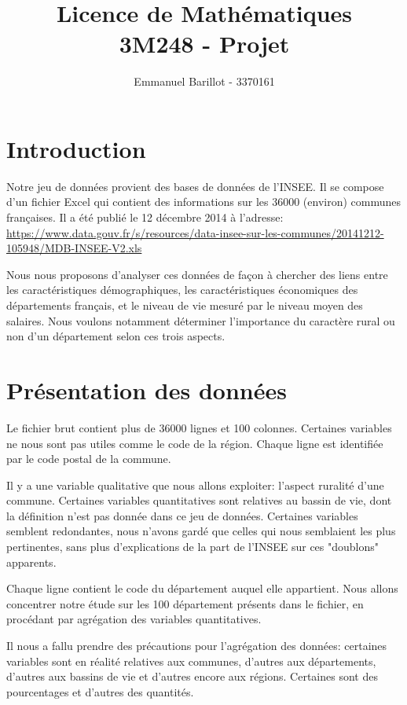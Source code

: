 \documentclass[a4paper,11pt]{article}
\title{Licence de Mathématiques \\3M248 - Projet}
\author{Emmanuel Barillot - 3370161}
\begin{document}
\maketitle



\section{Introduction}
Notre jeu de données provient des bases de données de l'INSEE. Il se compose d'un fichier Excel qui contient des informations sur les 36000 (environ) communes françaises.
Il a été publié le 12 décembre 2014 à l'adresse: 
\href{https://www.data.gouv.fr/s/resources/data-insee-sur-les-communes/20141212-105948/MDB-INSEE-V2.xls}{https://www.data.gouv.fr/s/resources/data-insee-sur-les-communes/20141212-105948/MDB-INSEE-V2.xls}

Nous nous proposons d'analyser ces données de façon à chercher des liens entre les caractéristiques démographiques, les caractéristiques économiques des départements français, et le niveau de vie mesuré par le niveau moyen des salaires.
Nous voulons notamment déterminer l'importance du caractère rural ou non d'un département selon ces trois aspects.


\section{Présentation des données}
Le fichier brut contient plus de 36000 lignes et 100 colonnes.
Certaines variables ne nous sont pas utiles comme le code de la région.
Chaque ligne est identifiée par le code postal de la commune.


Il y a une variable qualitative que nous allons exploiter: l'aspect ruralité d'une commune.
Certaines variables quantitatives sont relatives au bassin de vie, dont la définition n'est pas donnée dans ce jeu de données.
Certaines variables semblent redondantes, nous n'avons gardé que celles qui nous semblaient les plus pertinentes, sans plus d'explications de la part de l'INSEE sur ces "doublons" apparents.


Chaque ligne contient le code du département auquel elle appartient.
Nous allons concentrer notre étude sur les 100 département présents dans le fichier, en procédant par agrégation des variables quantitatives.

Il nous a fallu prendre des précautions pour l'agrégation des données: certaines variables sont en réalité relatives aux communes, d'autres aux départements, d'autres aux bassins de vie et d'autres encore aux régions.
Certaines sont des pourcentages et d'autres des quantités.
\end{document}
